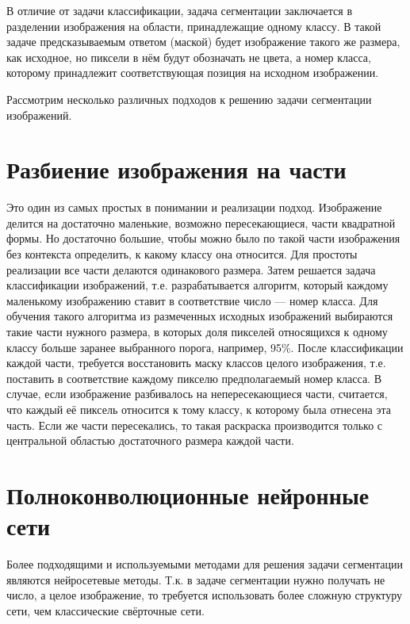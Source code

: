 В отличие от задачи классификации, задача сегментации заключается в разделении
изображения на области, принадлежащие одному классу. В такой задаче
предсказываемым ответом (маской) будет изображение такого же размера, как
исходное, но пиксели в нём будут обозначать не цвета, а номер класса, которому
принадлежит соответствующая позиция на исходном изображении.

Рассмотрим несколько различных подходов к решению задачи сегментации
изображений.

\section{Разбиение изображения на части}
Это один из самых простых в понимании и реализации подход. Изображение делится
на достаточно маленькие, возможно пересекающиеся, части квадратной формы. Но
достаточно большие, чтобы можно было по такой части изображения без контекста
определить, к какому классу она относится. Для простоты реализации все части
делаются одинакового размера. Затем решается задача классификации изображений,
т.е. разрабатывается алгоритм, который каждому маленькому изображению ставит в
соответствие число --- номер класса. Для обучения такого алгоритма из
размеченных исходных изображений выбираются такие части нужного размера, в
которых доля пикселей относящихся к одному классу больше заранее выбранного
порога, например, 95\%. После классификации каждой части, требуется восстановить
маску классов целого изображения, т.е. поставить в соответствие каждому пикселю
предполагаемый номер класса. В случае, если изображение разбивалось на
непересекающиеся части, считается, что каждый её пиксель относится к тому
классу, к которому была отнесена эта часть. Если же части пересекались, то такая
раскраска производится только с центральной областью достаточного размера каждой
части.

\section{Полноконволюционные нейронные сети}
Более подходящими и используемыми методами для решения задачи сегментации
являются нейросетевые методы. Т.к. в задаче сегментации нужно получать не число,
а целое изображение, то требуется использовать более сложную структуру сети, чем
классические свёрточные сети.

